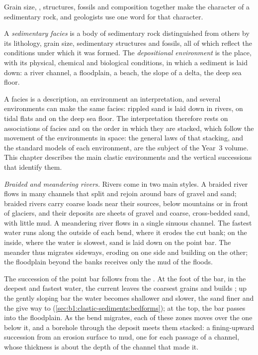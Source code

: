 Grain size, , structures, fossils and composition together make the
character of a sedimentary rock, and geologists use one word for that
character.

\begin{definition}\label{def:b1:clastic-sediments:facies}
A \emph{sedimentary facies} is a body of sedimentary
rock distinguished from others by its lithology, grain size, sedimentary
structures and fossils, all of which reflect the conditions under which it was
formed. The \emph{depositional environment} is
the place, with its physical, chemical and biological conditions, in which a
sediment is laid down: a river channel, a floodplain, a beach, the slope of a
delta, the deep sea floor.
\end{definition}

A facies is a description, an environment an interpretation, and several
environments can make the same facies: rippled sand is laid down in rivers, on
tidal flats and on the deep sea floor. The interpretation therefore rests on
associations of facies and on the order in which they are stacked, which follow
the movement of the environments in space: the general laws of that stacking,
and the standard models of each environment, are the subject of the Year~3
volume. This chapter describes the main clastic environments and the vertical
successions that identify them.

\emph{Braided and meandering rivers.} Rivers come in two main styles. A braided
river flows in many channels that split and rejoin around bars of gravel and
sand; braided rivers carry coarse loads near their sources, below mountains or
in front of glaciers, and their deposits are sheets of gravel and coarse,
cross-bedded sand, with little mud. A meandering river flows in a single
sinuous channel. The fastest water runs along the outside of each bend, where
it erodes the cut bank; on the inside, where the water is slowest, sand is laid
down on the point bar. The meander thus migrates sideways, eroding on one side
and building on the other; the floodplain beyond the banks receives only the
mud of the floods.

The succession of the point bar follows from the . At the foot of the
bar, in the deepest and fastest water, the current leaves the coarsest grains
and builds ; up the gently sloping bar the water becomes shallower and
slower, the sand finer and the  give way to 
(\cref{sec:b1:clastic-sediments:bedforms}); at the top, the bar passes into
the floodplain. As the bend migrates, each of these zones moves over the one
below it, and a borehole through the deposit meets them stacked: a fining-upward
succession from an erosion surface to mud, one for each passage of a channel,
whose thickness is about the depth of the channel that made it.

